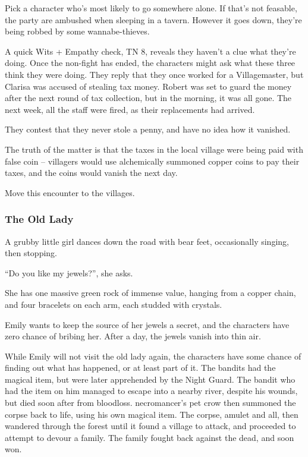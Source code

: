 Pick a character who's most likely to go somewhere alone.  If that's not feasable, the party are ambushed when sleeping in a tavern.  However it goes down, they're being robbed by some wannabe-thieves.

\humanmaid


\humanthief

A quick Wits + Empathy check, TN 8, reveals they haven't a clue what they're doing.  Once the non-fight has ended, the characters might ask what these three think they were doing.  They reply that they once worked for a Villagemaster, but Clarisa was accused of stealing tax money.  Robert was set to guard the money after the next round of tax collection, but in the morning, it was all gone.  The next week, all the staff were fired, as their replacements had arrived.

They contest that they never stole a penny, and have no idea how it vanished.

The truth of the matter is that the taxes in the local village were being paid with false coin -- villagers would use alchemically summoned copper coins to pay their taxes, and the coins would vanish the next day.

Move this encounter to the villages.

\subsubsection{The Old Lady}

\begin{boxtext}
	A grubby little girl dances down the road with bear feet, occasionally singing, then stopping.

		``Do you like my jewels?'', she asks.

	She has one massive green rock of immense value, hanging from a copper chain, and four bracelets on each arm, each studded with crystals.
\end{boxtext}

Emily wants to keep the source of her jewels a secret, and the characters have zero chance of bribing her.  After a day, the jewels vanish into thin air.

While Emily will not visit the old lady again, the characters have some chance of finding out what has happened, or at least part of it.  The bandits had the magical item, but were later apprehended by the Night Guard.  The bandit who had the item on him managed to escape into a nearby river, despite his wounds, but died soon after from bloodloss.  \Gls{necromancer}'s pet crow then summoned the corpse back to life, using his own magical item.  The corpse, amulet and all, then wandered through the forest until it found a village to attack, and proceeded to attempt to devour a family.  The family fought back against the dead, and soon won.

